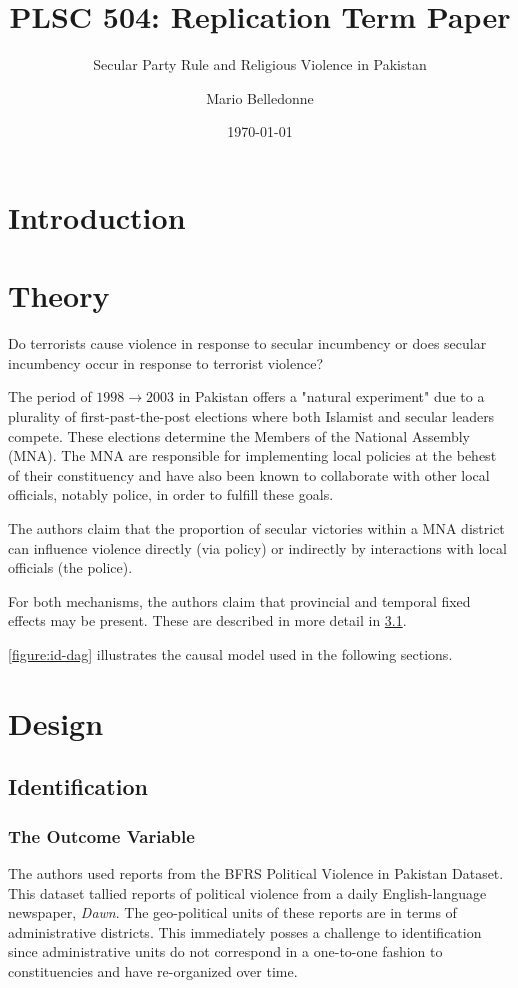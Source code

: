 \documentclass{scrartcl}
\title{PLSC 504: Replication Term Paper}
\subtitle{Secular Party Rule and Religious Violence in Pakistan}
\author{Mario Belledonne}
\date{\today}
\begin{document}
\maketitle

\section{Introduction}


\section{Theory}

Do terrorists cause violence in response to secular incumbency or does secular incumbency occur in response to terrorist violence?

The period of $1998 \rightarrow 2003$ in Pakistan offers a "natural experiment" due to a plurality of first-past-the-post elections where both Islamist and secular leaders compete. 
These elections determine the Members of the National Assembly (MNA). The MNA are responsible for implementing local policies at the behest of their constituency and have also been known to collaborate with other local officials, notably police, in order to fulfill these goals. 

The authors claim that the proportion of secular victories within a MNA district can influence violence directly (via policy) or indirectly by interactions with local officials (the police). 

For both mechanisms, the authors claim that provincial and temporal fixed effects may be present. These are described in more detail in \ref{identification}.

\ref{figure:id-dag} illustrates the causal model used in the following sections.

\section{Design}

\subsection{Identification} \label{identification}

\subsubsection{The Outcome Variable}

The authors used reports from the BFRS Political Violence in Pakistan Dataset. This dataset tallied reports of political violence from a daily English-language newspaper, \textit{Dawn}. The geo-political units of these reports are in terms of administrative districts. This immediately posses a challenge to identification since administrative units do not correspond in a one-to-one fashion to constituencies and have re-organized over time.
\end{document}
